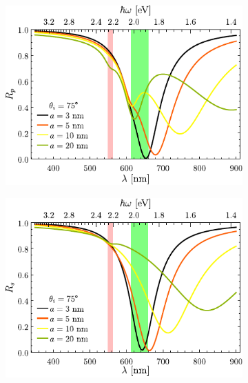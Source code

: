 \begin{figure}[h!]\centering\hspace*{-1.5em}
	\begin{subfigure}{.01\linewidth}\caption{}\label{sfig:R-RVar-cutp}\vspace{4.75cm}\end{subfigure}
	\begin{subfigure}{.45\linewidth}\hspace*{-1.5em}
	\includegraphics[scale=.98]{2-Resultados/figs/3-Wp4rVar/cut_angle_75_p.pdf}\end{subfigure}
	\begin{subfigure}{.01\linewidth}\caption{}\label{sfig:R-RVar-cuts}\vspace{4.75cm}\end{subfigure}\hspace*{-1.em}
	\begin{subfigure}{.45\linewidth}\centering
	\includegraphics[scale=.98 ]{2-Resultados/figs/3-Wp4rVar/cut_angle_75_s.pdf}\end{subfigure}\vspace*{-.5em}

\end{figure}
